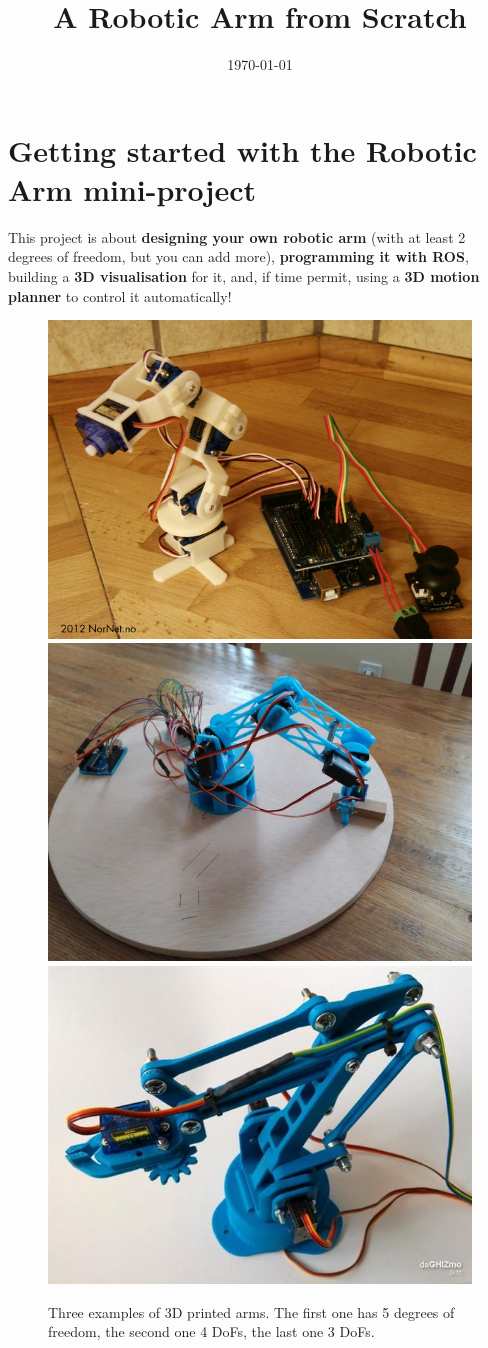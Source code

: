 \documentclass{instructions}
\title{A Robotic Arm from Scratch}
\subtitle{}
\date{\today}
\begin{document}
\maketitle

%
%
%
%


\pagebreak

\part{Getting started with the Robotic Arm mini-project}

This project is about \textbf{designing your own robotic arm} (with at least 2
degrees of freedom, but you can add more), \textbf{programming it with ROS},
building a
\textbf{3D visualisation} for it, and, if time permit, using a \textbf{3D motion
planner} to control it automatically!

\begin{figure}[h!]
    \centering
    \includegraphics[width=0.32\linewidth]{servo-arm}
    \includegraphics[width=0.32\linewidth]{servo-arm2}
    \includegraphics[width=0.32\linewidth]{servo-arm3}
    \caption{Three examples of 3D printed arms. The first one has 5 degrees of
    freedom, the second one 4 DoFs, the last one 3 DoFs.}
    \label{}
\end{figure}
\end{document}
